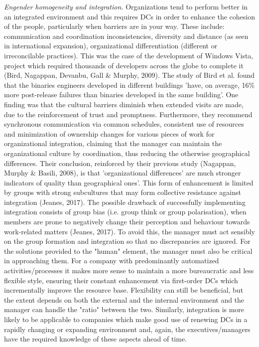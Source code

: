 \documentclass[11pt]{article}
\begin{document}
\emph{Engender homogeneity and integration.} Organizations tend to perform better in an integrated environment and this requires DCs in order to enhance the cohesion of the people, particularly when barriers are in your way. These include: communication and coordination inconsistencies, diversity and distance (as seen in international expansion), organizational differentiation (different or irreconcilable practices). This was the case of the development of Windows Vista, project which required thousands of developers across the globe to complete it (Bird, Nagappan, Devanbu, Gall \& Murphy, 2009). The study of Bird et al. found that the binaries engineers developed in different buildings 'have, on average, 16\% more post-release failures than binaries developed in the same building'. One finding was that the cultural barriers diminish when extended visits are made, due to the reinforcement of trust and promptness. Furthermore, they recommend synchronous communication via common schedules, consistent use of resources and minimization of ownership changes for various pieces of work for organizational integration, claiming that the manager can maintain the organizational culture by coordination, thus reducing the otherwise geographical differences. Their conclusion, reinforced by their previous study (Nagappan, Murphy \& Basili, 2008), is that 'organizational differences' are much stronger indicators of quality than geographical ones'. This form of enhancement is limited by groups with strong subcultures that may form collective resistance against integration (Jeanes, 2017). The possible drawback of successfully implementing integration consists of group bias (i.e. group think or group polarisation), when members are prone to negatively change their perception and behaviour towards work-related matters (Jeanes, 2017). To avoid this, the manager must act sensibly on the group formation and integration so that no discrepancies are ignored. \newline \newline
For the solutions provided to the "human" element, the manager must also be critical in approaching them. For a company with predominantly automatized activities/processes it makes more sense to maintain a more bureaucratic and less flexible style, ensuring their constant enhancement via first-order DCs which incrementally improve the resource base. Flexibility can still be beneficial, but the extent depends on both the external and the internal environment and the manager can handle the "ratio" between the two. Similarly, integration is more likely to be applicable to companies which make good use of renewing DCs in a rapidly changing or expanding environment and, again, the executives/managers have the required knowledge of these aspects ahead of time.
\end{document}
